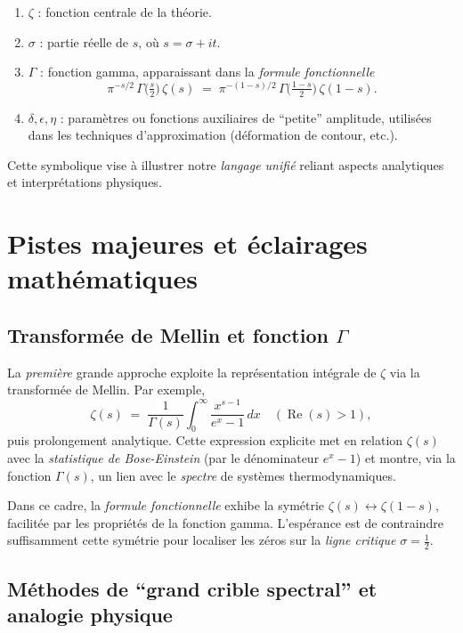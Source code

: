 \documentclass[11pt]{article}
\begin{document}
\begin{enumerate}
  \item \(\zeta\) : fonction centrale de la théorie.
  \item \(\sigma\) : partie réelle de \(s\), où \(s = \sigma + it\).
  \item \(\Gamma\) : fonction gamma, apparaissant dans la \emph{formule fonctionnelle}
    \[
      \pi^{-s/2} \,\Gamma\!\bigl(\tfrac s2\bigr)\,\zeta(s)
      \;=\;
      \pi^{-(1-s)/2} \,\Gamma\!\bigl(\tfrac{1-s}{2}\bigr)\,\zeta(1-s).
    \]
  \item \(\delta, \epsilon, \eta\) : paramètres ou fonctions auxiliaires de “petite” amplitude, utilisées dans les techniques d'approximation (déformation de contour, etc.).
\end{enumerate}

Cette symbolique vise à illustrer notre \emph{langage unifié} reliant aspects analytiques et interprétations physiques.

\section{Pistes majeures et éclairages mathématiques}

\subsection{Transformée de Mellin et fonction \(\Gamma\)}

La \emph{première} grande approche exploite la représentation intégrale de $\zeta$ via la transformée de Mellin. Par exemple,
\[
  \zeta(s) 
  \;=\; 
  \frac{1}{\Gamma(s)} 
  \int_0^\infty 
    \frac{x^{s-1}}{e^x - 1} \,dx
  \quad(\operatorname{Re}(s) > 1),
\]
puis prolongement analytique. Cette expression explicite met en relation $\zeta(s)$ avec la \emph{statistique de Bose-Einstein} (par le dénominateur $e^x - 1$) et montre, via la fonction $\Gamma(s)$, un lien avec le \emph{spectre} de systèmes thermodynamiques.

Dans ce cadre, la \emph{formule fonctionnelle} exhibe la symétrie \(\zeta(s)\leftrightarrow \zeta(1-s)\), facilitée par les propriétés de la fonction gamma. L'espérance est de contraindre suffisamment cette symétrie pour localiser les zéros sur la \emph{ligne critique} \(\sigma=\tfrac12\).

\subsection{Méthodes de “grand crible spectral” et analogie physique}
\end{document}
